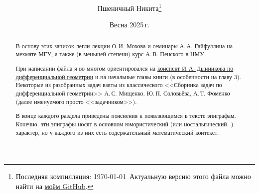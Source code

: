 \documentclass[a4paper, twoside, leqno, 11pt]{article}
\begin{document}
\title{\bfseries\scshape\course}
\date{Весна 2025\,г.}
\author{Пшеничный Никита\thanks{Последняя компилляция: \today\ Актуальную версию этого файла можно найти на \href{https://github.com/pshenikita/Differential-Geometry}{моём GitHub}.}}

\maketitle
\begin{abstract}
	В основу этих записок легли лекции О.\,И. Мохова и семинары А.\,А. Гайфуллина на мехмате МГУ, а также (в меньшей степени) курс А.\,В. Пенского в НМУ.

	При написании файла я во многом ориентировался на \href{https://www.dropbox.com/scl/fi/cfn0ut0j1bqdxezkcame8/classdiffgeom2019.pdf?rlkey=rxuyw5kqc2kz3yolamqv7npdv&e=1}{конспект И.\,А. Дынникова по дифференциальной геометрии} и на начальные главы книги \cite{NT14} (в особенности на главу 3). Некоторые из разобранных задач взяты из классического <<Сборника задач по дифференциальной геометрии>> А.\,С. Мищенко, Ю.\,П. Соловьёва, А.\,Т. Фоменко (далее именуемого просто <<задачником>>).

	В конце каждого раздела приведены пояснения к появляющимся в тексте эпиграфам. Конечно, эти эпиграфы носят в основном юмористический (или ностальгический\ldots) характер, но у каждого из них есть содержательный математический контекст.

	
\end{abstract}

\tableofcontents




\end{document}
